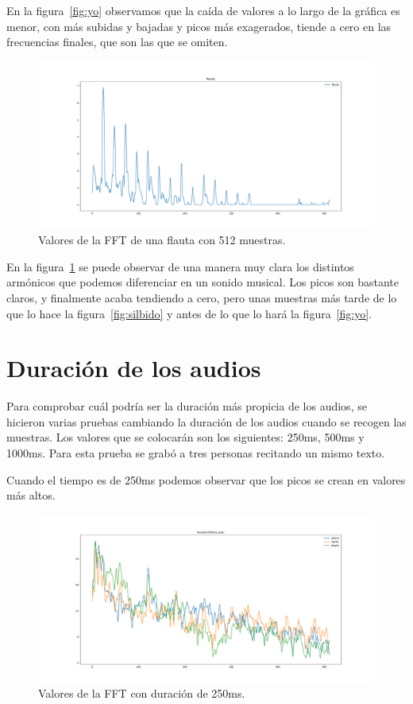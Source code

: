 \documentclass[a4paper, 12pt]{book}
\begin{document}
En la figura~\ref{fig:yo} observamos que la caída de valores a lo largo de la gráfica es menor, con más subidas y bajadas y picos más exagerados, tiende a cero en las frecuencias finales, que son las que se omiten.

\begin{figure}
	\centering
	\includegraphics[width=12cm, keepaspectratio]{img/flauta512.png}
	\caption{Valores de la FFT de una flauta con 512 muestras.}\label{fig:flauta}
\end{figure}

En la figura~\ref{fig:flauta} se puede observar de una manera muy clara los distintos armónicos que podemos diferenciar en un sonido musical. Los picos son bastante claros, y finalmente acaba tendiendo a cero, pero unas muestras más tarde de lo que lo hace la figura~\ref{fig:silbido} y antes de lo que lo hará la figura~\ref{fig:yo}.


\section{Duración de los audios}
\label{sec:duracion-audio}

Para comprobar cuál podría ser la duración más propicia de los audios, se hicieron varias pruebas cambiando la duración de los audios cuando se recogen las muestras. Los valores que se colocarán son los siguientes: 250ms, 500ms y 1000ms. Para esta prueba se grabó a tres personas recitando un mismo texto.

Cuando el tiempo es de 250ms podemos observar que los picos se crean en valores más altos.

\begin{figure}
	\centering
	\includegraphics[width=12cm, keepaspectratio]{img/locutor250ms.png}
	\caption{Valores de la FFT con duración de 250ms.}\label{fig:locutor250ms}
\end{figure}
\end{document}
